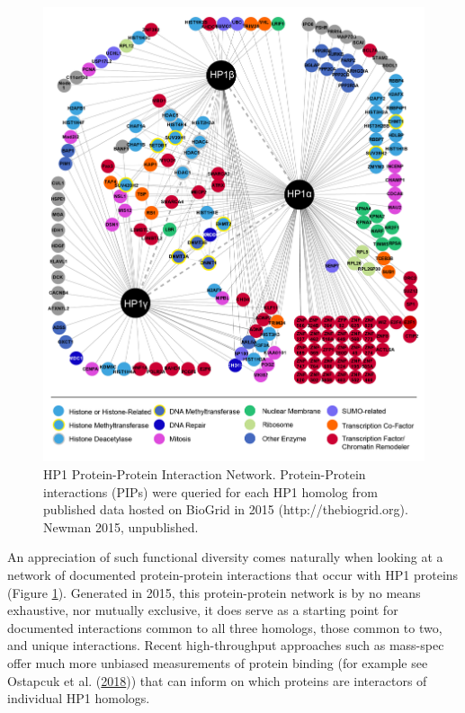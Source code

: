 \documentclass[onehalf,12pt]{beavtex}
\begin{document}
  \begin{figure}
  
  {\centering \includegraphics[width=1\linewidth, ]{./figure/introduction/HP1pip} 
  
  }
  
  \caption[HP1 Protein-Protein Interaction Network]{HP1 Protein-Protein Interaction Network.  Protein-Protein interactions (PIPs) were queried for each HP1 homolog from published data hosted on BioGrid in 2015 (http://thebiogrid.org). Newman 2015, unpublished.}\label{fig:HP1pip}
  \end{figure}
  
  An appreciation of such functional diversity comes naturally when
  looking at a network of documented protein-protein interactions that
  occur with HP1 proteins (Figure \ref{fig:HP1pip}). Generated in 2015,
  this protein-protein network is by no means exhaustive, nor mutually
  exclusive, it does serve as a starting point for documented interactions
  common to all three homologs, those common to two, and unique
  interactions. Recent high-throughput approaches such as mass-spec offer
  much more unbiased measurements of protein binding (for example see
  Ostapcuk et al.
  (\protect\hyperlink{ref-OstapcukActivitydependentneuroprotectiveprotein2018}{2018}))
  that can inform on which proteins are interactors of individual HP1
  homologs.\\
  \FloatBarrier
  
\end{document}
